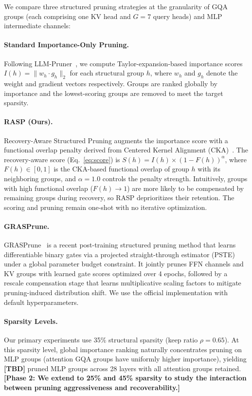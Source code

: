 We compare three structured pruning strategies at the granularity of GQA groups (each comprising one KV head and $G{=}7$ query heads) and MLP intermediate channels:

\paragraph{Standard Importance-Only Pruning.}
Following LLM-Pruner~\citep{llmpruner2023}, we compute Taylor-expansion-based importance scores $I(h) = \|w_h \cdot g_h\|_2$ for each structural group $h$, where $w_h$ and $g_h$ denote the weight and gradient vectors respectively. Groups are ranked globally by importance and the lowest-scoring groups are removed to meet the target sparsity.

\paragraph{RASP (Ours).}
Recovery-Aware Structured Pruning augments the importance score with a functional overlap penalty derived from Centered Kernel Alignment (CKA)~\citep{kornblith2019cka}.
The recovery-aware score (Eq.~\eqref{eq:score}) is $S(h) = I(h) \times (1 - F(h))^\alpha$, where $F(h) \in [0,1]$ is the CKA-based functional overlap of group $h$ with its neighboring groups, and $\alpha{=}1.0$ controls the penalty strength.
Intuitively, groups with high functional overlap ($F(h) \to 1$) are more likely to be compensated by remaining groups during recovery, so RASP deprioritizes their retention.
The scoring and pruning remain one-shot with no iterative optimization.

\paragraph{GRASPrune.}
GRASPrune~\citep{graspprune2026} is a recent post-training structured pruning method that learns differentiable binary gates via a projected straight-through estimator (PSTE) under a global parameter budget constraint.
It jointly prunes FFN channels and KV groups with learned gate scores optimized over 4 epochs, followed by a rescale compensation stage that learns multiplicative scaling factors to mitigate pruning-induced distribution shift.
We use the official implementation with default hyperparameters.

\paragraph{Sparsity Levels.}
Our primary experiments use 35\% structural sparsity (keep ratio $\rho{=}0.65$).
At this sparsity level, global importance ranking naturally concentrates pruning on MLP groups (attention GQA groups have uniformly higher importance), yielding \textbf{[TBD]} pruned MLP groups across 28 layers with all attention groups retained.
\textbf{[Phase 2: We extend to 25\% and 45\% sparsity to study the interaction between pruning aggressiveness and recoverability.]}

